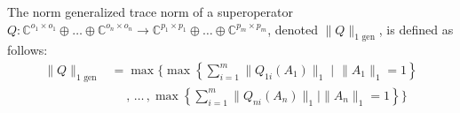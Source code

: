 \begin{definition} \label{def:gen_1norm}
  The norm generalized trace norm of a superoperator $Q: \mathbb{C}^{o_1 \times o_1} \oplus \ldots \oplus \mathbb{C}^{o_n \times o_n}  \rightarrow \mathbb{C}^{p_1 \times p_1} \oplus \ldots \oplus  \mathbb{C}^{p_m \times p_m} $, denoted $\|Q\|_{1 \text{ gen}}$, is defined as follows:
\begin{equation}
  \begin{split}
  \|Q\|_{1 \text{ gen}} & = \max  \Bigg\{ \max \left\{ \sum_{i=1}^{m} \|Q_{1i} (A_1)\|_{1}   \mid \hspace{1pt} \|A_1\|_{1} = 1 \right\} \\
  & \hspace{15pt} ,\hspace{2pt}  \ldots \hspace{2pt}  , \max \left\{ \sum_{i=1}^{m} \|Q_{ni} (A_n)\|_{1}   \mid \|A_n\|_{1} = 1 \right\} \Bigg\} 
  \end{split}
\end{equation}
\end{definition}



